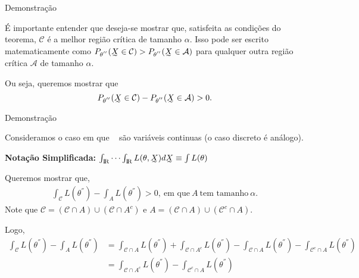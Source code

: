 \documentclass[12pt]{beamer}
\begin{document}
\begin{frame}{Demonstração}
	\begin{block}{}
		\justifying
		É importante entender que deseja-se mostrar que, satisfeita as condições do teorema, $\mathcal{C}$ é a melhor região crítica de tamanho $\alpha.$ Isso pode ser escrito matematicamente como $P_{\theta^{''}}(\undertilde{X}\in\mathcal{C})>P_{\theta^{''}}(\undertilde{X}\in\mathcal{A})$ para qualquer outra região crítica $\mathcal{A}$ de tamanho $\alpha.$
	\end{block}
	\pause
	\begin{block}{}
		\justifying
		Ou seja, queremos mostrar que $$P_{\theta^{''}}(\undertilde{X}\in\mathcal{C})-P_{\theta^{''}}(\undertilde{X}\in\mathcal{A})>0.$$
	\end{block}
\end{frame}

\begin{frame}{Demonstração}
\begin{block}{}
\justifying
Consideramos o caso em que \seqX~ são variáveis continuas (o caso discreto é análogo).

\textbf{Notação Simplificada:} $\int_{\R}\cdots\int_{\R}L(\theta,\undertilde{X})d\undertilde{X}\equiv \int L(\theta)$
\end{block}
\pause
\begin{block}{}
\justifying
Queremos mostrar que,
\begin{align*}
    \int_{\mathcal{C}}L(\theta^{''})-\int_{A}L(\theta^{''})>0,~\text{em que}~A~\text{tem tamanho}~\alpha.
\end{align*}
Note que $\mathcal{C}=(\mathcal{C}\cap A)\cup (\mathcal{C}\cap A^{c})$ e $A=(\mathcal{C}\cap A)\cup (\mathcal{C}^{c}\cap A).$
\end{block}
\end{frame}

\begin{frame}{}
\begin{block}{}
\justifying
Logo,
{\footnotesize
\begin{align*}
\int_{\mathcal{C}}L(\theta^{''})-\int_{A}L(\theta^{''})&= \int_{\mathcal{C}\cap A}L(\theta^{''}) + \int_{\mathcal{C}\cap A^{c}}L(\theta^{''}) - \int_{\mathcal{C}\cap A}L(\theta^{''})-\int_{\mathcal{C}^{c}\cap A}L(\theta^{''})\\
&= \int_{\mathcal{C}\cap A^{c}}L(\theta^{''}) - \int_{\mathcal{C}^{c}\cap A}L(\theta^{''})
\end{align*}
}
\end{block}
\end{frame}
\end{document}
